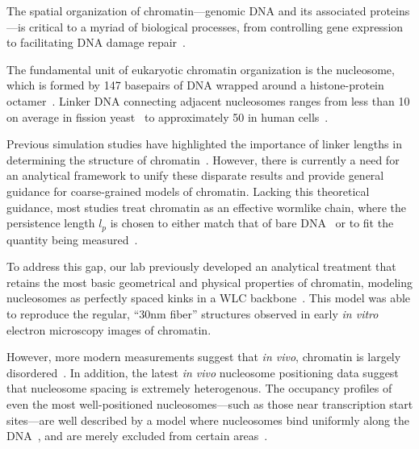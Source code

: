 \documentclass[%
 reprint,
superscriptaddress,
showpacs,preprintnumbers,
 amsmath,amssymb,
 aps,
 prl,
]{revtex4-1}
\begin{document}

The spatial organization of chromatin---genomic DNA and its associated proteins---is critical
    to a myriad of biological processes, from controlling gene expression~\cite{hubner2013}
    to facilitating DNA damage repair~\cite{hauer2017,stadler2017}.

The fundamental unit of eukaryotic chromatin organization is the
    nucleosome, which is formed by 147 basepairs of DNA wrapped around a histone-protein
    octamer~\cite{cutter2015a}.
Linker DNA connecting adjacent nucleosomes ranges from less than \SI{10}{\basepair} on
    average in fission yeast~\cite{givens2012} to approximately {\SI{50}{\basepair}} in human
    cells~\cite{schones2008}.

Previous simulation studies have highlighted the importance of linker lengths
    in determining the structure of chromatin~\cite{%
    bascom2017a,collepardo-guevara2014,bascom2018,grigoryev2016,kepper2008,
    koslover2010,langowski2007,muller2014,schiessel2001,scipioni2010,wedemann2002,
    woodcock1993}.
However, there is currently a need for an analytical framework to unify these
    disparate results and provide general guidance for coarse-grained models of
    chromatin.
Lacking this theoretical guidance, most studies treat chromatin as an effective
    wormlike chain, where the persistence length $l_p$ is chosen to either
    match that of bare DNA~\cite{benedetti2017, macpherson2018,nuebler2018} or
    to fit the quantity being measured~\cite{sanborn2015,pierro2017}.

To address this gap, our lab previously developed an analytical treatment that
    retains the most basic geometrical and physical properties of chromatin,
    modeling nucleosomes as perfectly spaced kinks in a WLC
    backbone~\cite{koslover2013a}.
This model was able to reproduce the regular, ``30nm fiber'' structures observed
    in early \textit{in vitro} electron microscopy images of chromatin.

However, more modern measurements suggest that \textit{in vivo}, chromatin is largely
    disordered~\cite{ou2017}.
In addition, the latest \textit{in vivo} nucleosome positioning data suggest that nucleosome
    spacing is extremely heterogenous.
The occupancy profiles of even the most well-positioned nucleosomes---such as those near
    transcription start sites---are well described by a model where nucleosomes bind
    uniformly along the DNA~\cite{kornberg1988, chevereau2009, chereji2011,
    beshnova2014, chou2007, kornberg1981, mavrich2008, mobius2010, mobius2013,
    teif2010, tesoro2016, muller2014%
    }, and are merely excluded from certain areas~\cite{ozonov2013}.
\end{document}
